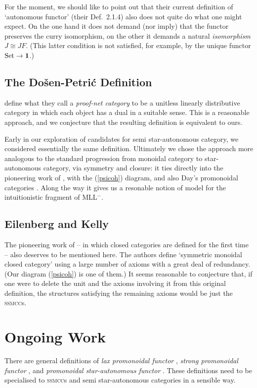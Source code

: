 \documentclass{robincs}
\let\defn = \emph
\newcommand\curry{\mathrm{curry}}
\newcommand\pref[1]{\textup(\ref{#1}\textup)}
\newcommand\staraut{star-aut\-on\-om\-ous\xspace}
\newcommand\stac  {star-aut\-on\-om\-ous category\xspace}
\newcommand\sstac {semi star-aut\-on\-om\-ous category\xspace}
\newcommand\sstacs{semi star-aut\-on\-om\-ous categories\xspace}
\newcommand\SECCs{\textsc{ssmcc}s\xspace}
\newcommand\mll  {MLL$^-$\xspace}
\begin{document}
For the moment, we should like to point out that their current
definition of `autonomous functor' (their Def.~2.1.4) also does not
quite do what one might expect.
On the one hand it does not demand
(nor imply) that the functor preserves the $\curry$ isomorphism, on
the other it demands a natural \emph{isomorphism} $J\cong JF$. (This
latter condition is not satisfied, for example, by the unique functor
$\mathrm{Set}\to\mathbf1$.)


\subsection{The Do{\v s}en-Petri{\'c} Definition}\label{s-dp}
\citet{ProofNetCats} define what they call a \defn{proof-net category}
to be a unitless linearly distributive category in which each object
has a dual in a suitable sense. This is a reasonable approach, and
we conjecture that the resulting definition is equivalent to ours.

Early in our exploration of candidates for \sstac,
we considered essentially the same definition.
Ultimately we chose the approach more analogous to the
standard progression from monoidal category to \stac,
via symmetry and closure: it ties directly into the pioneering work
of \citet{EKClosed}, with the \pref{psicoh} diagram, and also
Day's promonoidal categories \citeyearpar{DayPro}.
Along the way it gives us a resonable notion of model for
the intuitionistic fragment of \mll.

\subsection{Eilenberg and Kelly}\label{s-ek}
The pioneering work of \citet{EKClosed} -- in which closed
categories are defined for the first time -- also deserves to be
mentioned here. The authors define `symmetric monoidal closed
category' using a large number of axioms with a great deal
of redundancy. (Our diagram \pref{psicoh} is one of them.)
It seems reasonable to conjecture that, if one were to delete
the unit and the axioms involving it from this original
definition, the structures satisfying the remaining axioms
would be just the \SECCs.

\section{Ongoing Work}
There are general definitions of \emph{lax promonoidal functor}
\citep{DayMonoidalMonads}, \emph{strong promonoidal functor}
\citep{PromonKan}, and \emph{promonoidal \staraut{} functor}
\citep{DSQuantum}.
These definitions need to be specialised to \SECCs and \sstacs in a
sensible way.
\end{document}
